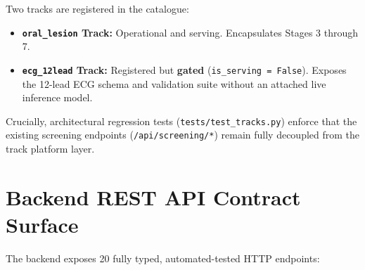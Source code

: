 \documentclass[11pt,a4paper]{report}
\begin{document}
Two tracks are registered in the catalogue:
\begin{itemize}
  \item \textbf{\texttt{oral\_lesion} Track:} Operational and serving. Encapsulates Stages 3 through 7.
  \item \textbf{\texttt{ecg\_12lead} Track:} Registered but \textbf{gated} (\texttt{is\_serving = False}). Exposes the 12-lead ECG schema and validation suite without an attached live inference model.
\end{itemize}

Crucially, architectural regression tests (\texttt{tests/test\_tracks.py}) enforce that the existing screening endpoints (\texttt{/api/screening/*}) remain fully decoupled from the track platform layer.

\section{Backend REST API Contract Surface}
The backend exposes 20 fully typed, automated-tested HTTP endpoints:
\end{document}
